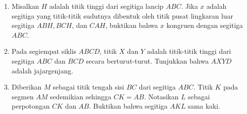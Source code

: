 \documentclass[12pt]{scrartcl}
\begin{document}
\begin{enumerate}
	\item
	Misalkan $H$ adalah titik tinggi dari segitiga lancip $ABC$. Jika $x$ adalah segitiga yang titik-titik sudutnya dibentuk oleh titik pusat lingkaran luar segitiga $ABH,BCH$, dan $CAH$, buktikan bahwa $x$ kongruen dengan segitiga $ABC$.
	
	\item
	Pada segiempat siklis $ABCD$, titik $X$ dan $Y$ adalah titik-titik tinggi dari segitiga $ABC$ dan $BCD$ secara berturut-turut. Tunjukkan bahwa $AXYD$ adalah jajargenjang.
	
	\item
	Diberikan $M$ sebagai titik tengah sisi $BC$ dari segitiga $ABC$. Titik $K$ pada segmen $AM$ sedemikian sehingga $CK=AB$. Notasikan $L$ sebagai perpotongan $CK$ dan $AB$. Buktikan bahwa segitiga $AKL$ sama kaki.
\end{enumerate}
\end{document}
